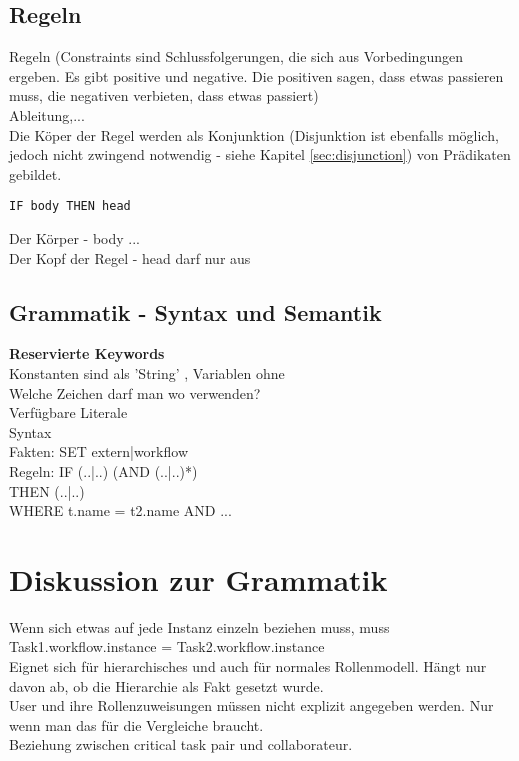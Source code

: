 \subsection{Regeln}
Regeln (Constraints sind Schlussfolgerungen, die sich aus Vorbedingungen ergeben. Es gibt positive und negative. Die positiven sagen, dass etwas passieren muss, die negativen verbieten, dass etwas passiert)\\
Ableitung,...\\
Die Köper der Regel werden als Konjunktion (Disjunktion ist ebenfalls möglich, jedoch nicht zwingend notwendig - siehe Kapitel \ref{sec:disjunction}) von Prädikaten gebildet.\\

\begin{verbatim}
IF body THEN head
\end{verbatim}

Der Körper - body ...\\
Der Kopf der Regel - head darf nur aus 

\subsection{Grammatik - Syntax und Semantik}

\textbf{Reservierte Keywords}\\




Konstanten sind als 'String' , Variablen ohne \\
Welche Zeichen darf man wo verwenden?\\
Verfügbare Literale\\
Syntax\\
Fakten: SET extern|workflow \\
Regeln: 	IF (..|..) (AND (..|..)*) \\
THEN (..|..) \\
WHERE t.name = t2.name AND  ...\\


%
%
\section{Diskussion zur Grammatik}
Wenn sich etwas auf jede Instanz einzeln beziehen muss, muss Task1.workflow.instance = Task2.workflow.instance\\
Eignet sich für hierarchisches und auch für normales Rollenmodell. Hängt nur davon ab, ob die Hierarchie als Fakt gesetzt wurde.\\
User und ihre Rollenzuweisungen müssen nicht explizit angegeben werden. Nur wenn man das für die Vergleiche braucht.\\
Beziehung zwischen critical task pair und collaborateur.
